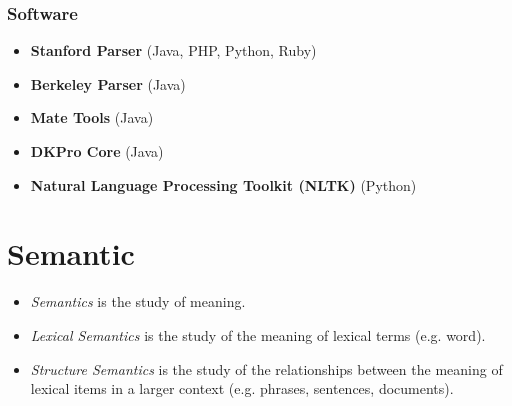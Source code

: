 			\subsubsection{Software} %
				\begin{itemize}
					\item \textbf{Stanford Parser} (Java, PHP, Python, Ruby)
					\item \textbf{Berkeley Parser} (Java)
					\item \textbf{Mate Tools} (Java)
					\item \textbf{DKPro Core} (Java)
					\item \textbf{Natural Language Processing Toolkit (NLTK)} (Python)
				\end{itemize}

	\section{Semantic} %
		\begin{itemize}
			\item \textit{Semantics} is the study of meaning.
			\item \textit{Lexical Semantics} is the study of the meaning of lexical terms (e.g. word).
			\item \textit{Structure Semantics} is the study of the relationships between the meaning of lexical items in a larger context (e.g. phrases, sentences, documents).
		\end{itemize}

